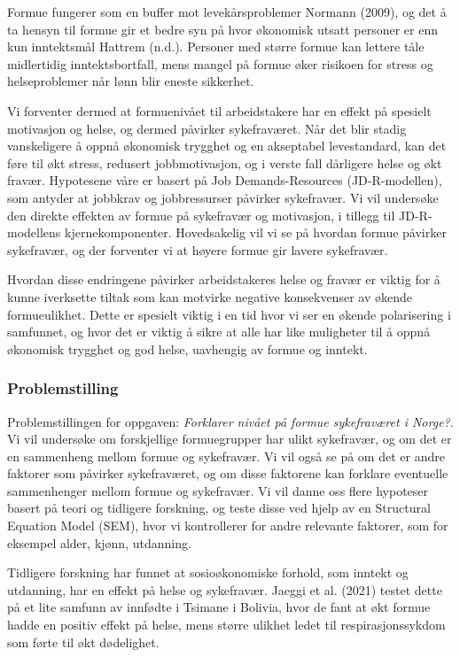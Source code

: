 \documentclass[
  12pt,
  a4paper,
  DIV=11,
  numbers=noendperiod]{scrartcl}
\begin{document}
Formue fungerer som en buffer mot levekårsproblemer Normann (2009), og
det å ta hensyn til formue gir et bedre syn på hvor økonomisk utsatt
personer er enn kun inntektsmål Hattrem (n.d.). Personer med større
formue kan lettere tåle midlertidig inntektsbortfall, mens mangel på
formue øker risikoen for stress og helseproblemer når lønn blir eneste
sikkerhet.

Vi forventer dermed at formuenivået til arbeidstakere har en effekt på
spesielt motivasjon og helse, og dermed påvirker sykefraværet. Når det
blir stadig vanskeligere å oppnå økonomisk trygghet og en akseptabel
levestandard, kan det føre til økt stress, redusert jobbmotivasjon, og i
verste fall dårligere helse og økt fravær. Hypotesene våre er basert på
Job Demands-Resources (JD-R-modellen), som antyder at jobbkrav og
jobbressurser påvirker sykefravær. Vi vil undersøke den direkte effekten
av formue på sykefravær og motivasjon, i tillegg til JD-R-modellens
kjernekomponenter. Hovedsakelig vil vi se på hvordan formue påvirker
sykefravær, og der forventer vi at høyere formue gir lavere sykefravær.

Hvordan disse endringene påvirker arbeidstakeres helse og fravær er
viktig for å kunne iverksette tiltak som kan motvirke negative
konsekvenser av økende formueulikhet. Dette er spesielt viktig i en tid
hvor vi ser en økende polarisering i samfunnet, og hvor det er viktig å
sikre at alle har like muligheter til å oppnå økonomisk trygghet og god
helse, uavhengig av formue og inntekt.

\subsubsection{Problemstilling}\label{problemstilling}

Problemstillingen for oppgaven: \emph{Forklarer nivået på formue
sykefraværet i Norge?}. Vi vil undersøke om forskjellige formuegrupper
har ulikt sykefravær, og om det er en sammenheng mellom formue og
sykefravær. Vi vil også se på om det er andre faktorer som påvirker
sykefraværet, og om disse faktorene kan forklare eventuelle sammenhenger
mellom formue og sykefravær. Vi vil danne oss flere hypoteser basert på
teori og tidligere forskning, og teste disse ved hjelp av en Structural
Equation Model (SEM), hvor vi kontrollerer for andre relevante faktorer,
som for eksempel alder, kjønn, utdanning.

Tidligere forskning har funnet at sosioøkonomiske forhold, som inntekt
og utdanning, har en effekt på helse og sykefravær. Jaeggi et al. (2021)
testet dette på et lite samfunn av innfødte i Tsimane i Bolivia, hvor de
fant at økt formue hadde en positiv effekt på helse, mens større ulikhet
ledet til respirasjonssykdom som førte til økt dødelighet.
\end{document}
